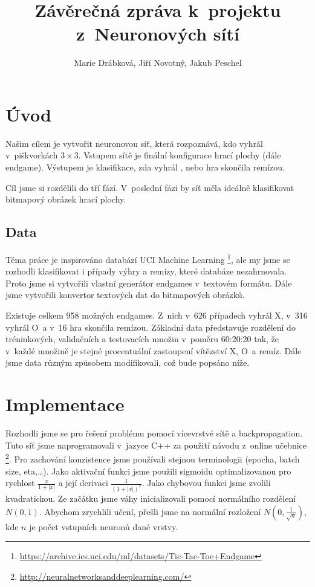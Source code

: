 \documentclass[10pt,a4paper]{article}
\title{Závěrečná zpráva k~projektu z~Neuronových sítí}
\author{Marie Drábková, Jiří Novotný, Jakub Peschel}
\begin{document}
\maketitle

\section*{Úvod}
Našim cílem je vytvořit neuronovou síť, která rozpoznává, kdo vyhrál v~piškvorkách $3\times 3$. Vstupem sítě je finální konfigurace hrací plochy (dále endgame). Výstupem je klasifikace, zda vyhrál  ,  nebo hra skončila remízou. 

Cíl jsme si rozdělili do tří fází. V~poslední fázi by síť měla ideálně klasifikovat bitmapový obrázek hrací plochy.


\subsection*{Data}
Téma práce je inspirováno databází UCI Machine Learning \footnote{\url{https://archive.ics.uci.edu/ml/datasets/Tic-Tac-Toe+Endgame}}, ale my jsme se rozhodli klasifikovat i případy výhry  a remízy, které databáze nezahrnovala. Proto jsme si vytvořili vlastní generátor endgames v~textovém formátu. Dále jsme vytvořili konvertor textových dat do bitmapových obrázků.

Existuje celkem 958 možných endgames. Z~nich v~626 případech vyhrál X, v~316 vyhrál O~a v~16 hra skončila remízou. Základní data představuje rozdělení do tréninkových, validačních a testovacích množin v~poměru 60:20:20 tak, že v~každé množině je stejné procentuální zastoupení vítězství X, O~a remíz. Dále jsme data různým způsobem modifikovali, což bude popsáno níže.

\section*{Implementace}
Rozhodli jsme se pro řešení problému pomocí vícevrstvé sítě a backpropagation. Tuto síť jsme naprogramovali v~jazyce C++ za použití návodu z~online učebnice  \footnote{\url{http://neuralnetworksanddeeplearning.com/}}. Pro zachování konzistence jsme používali stejnou terminologii (epocha, batch size, eta,\dots). Jako aktivační funkci jsme použili sigmoidu optimalizovanou pro rychlost $\frac{x}{1+|x|}$ a její derivaci $\frac{1}{(1+|x|)^2}$. Jako chybovou funkci jsme zvolili kvadratickou. Ze začátku jsme váhy inicializovali pomocí normálního rozdělení $N(0,1)$. Abychom zrychlili učení, přešli jsme na normální rozložení $N\left(0,\frac{1}{\sqrt{n}}\right)$, kde $n$ je počet vstupních neuronů dané vrstvy.
\end{document}
